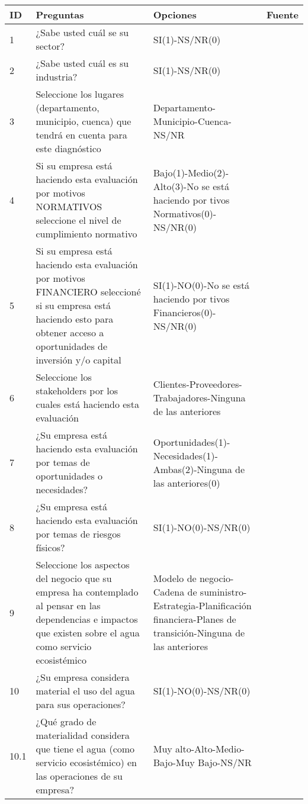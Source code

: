 \begin{longtable}{p{0.75cm}|p{6cm}|p{6cm}|p{2cm}}
\textbf{ID} & \textbf{Preguntas} & \textbf{Opciones} & \textbf{Fuente}  \\
\hline\hline
1 & ¿Sabe usted cuál se su sector? & SI(1)-NS/NR(0) & \parencite{sasb-standards-2023} \\
\hline
2 & ¿Sabe usted cuál es su industria? & SI(1)-NS/NR(0) & \parencite{sasb-standards-2023} \\
\hline
3 & Seleccione los lugares (departamento, municipio, cuenca) que tendrá en cuenta para este diagnóstico & Departamento-Municipio-Cuenca-NS/NR & \parencite{capitals-coalition-2021} \\
\hline
4 & Si su empresa está haciendo esta evaluación por motivos NORMATIVOS seleccione el nivel de cumplimiento normativo & Bajo(1)-Medio(2)-Alto(3)-No se está haciendo por tivos Normativos(0)-NS/NR(0) &  \\
\hline
5 & Si su empresa está haciendo esta evaluación por motivos FINANCIERO seleccioné si  su empresa está haciendo esto para obtener acceso a oportunidades de inversión y/o capital & SI(1)-NO(0)-No se está haciendo por tivos Financieros(0)-NS/NR(0) & \parencite{capitals-coalition-2021} \\
\hline
6 & Seleccione los stakeholders por los cuales está haciendo esta evaluación & Clientes-Proveedores-Trabajadores-Ninguna de las anteriores & \parencite{capitals-coalition-2021} \\
\hline
7 & ¿Su empresa está haciendo esta evaluación por temas de oportunidades o necesidades? & Oportunidades(1)-Necesidades(1)-Ambas(2)-Ninguna de las anteriores(0) &  \\
\hline
8 & ¿Su empresa está haciendo esta evaluación por temas de riesgos físicos? & SI(1)-NO(0)-NS/NR(0) &  \\
\hline
9 & Seleccione los aspectos del negocio que su empresa ha contemplado al pensar en las dependencias e impactos que existen sobre el agua como servicio ecosistémico & Modelo de negocio-Cadena de suministro-Estrategia-Planificación financiera-Planes de transición-Ninguna de las anteriores & \parencite{its-now-for-nature-2023} \\
\hline
10 & ¿Su empresa considera material el uso del agua para sus operaciones? & SI(1)-NO(0)-NS/NR(0) &  \\
\hline
10.1 & ¿Qué grado de materialidad considera que tiene el agua (como servicio ecosistémico) en las operaciones de su empresa? & Muy alto-Alto-Medio-Bajo-Muy Bajo-NS/NR &  \\

\end{longtable}
